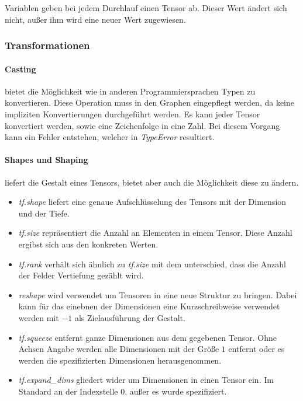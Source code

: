 Variablen geben bei jedem Durchlauf einen Tensor ab.
Dieser Wert ändert sich nicht, außer ihm wird eine neuer Wert zugewiesen. 

\subsubsection{Transformationen}

\paragraph{Casting} bietet die Möglichkeit wie in anderen Programmiersprachen Typen zu konvertieren. 
Diese Operation muss in den Graphen eingepflegt werden, da keine impliziten Konvertierungen durchgeführt werden. 
Es kann jeder Tensor konvertiert werden, sowie eine Zeichenfolge in eine Zahl. 
Bei diesem Vorgang kann ein Fehler entstehen, welcher in \textit{TypeError} resultiert.

\paragraph{Shapes und Shaping} liefert die Gestalt eines Tensors, bietet aber auch die Möglichkeit diese zu ändern. 
\begin{itemize}
	\item \textit{tf.shape} liefert eine genaue Aufschlüsselung des Tensors mit der Dimension und der Tiefe.
	\item \textit{tf.size} repräsentiert die Anzahl an Elementen in einem Tensor. 
	Diese Anzahl ergibst sich aus den konkreten Werten.
	\item \textit{tf.rank} verhält sich ähnlich zu \textit{tf.size} mit dem unterschied, dass die Anzahl der Felder Vertiefung gezählt wird.
	\item \textit{reshape} wird verwendet um Tensoren in eine neue Struktur zu bringen. 
	Dabei kann für das einebnen der Dimensionen eine Kurzschreibweise verwendet werden mit $-1$ als Zielausführung der Gestalt.
	\item \textit{tf.squeeze} entfernt ganze Dimensionen aus dem gegebenen Tensor. 
	Ohne Achsen Angabe werden alle Dimensionen mit der Größe $1$ entfernt oder es werden die spezifizierten Dimensionen herausgenommen.
	\item \textit{tf.expand\_dims} gliedert wider um Dimensionen in einen Tensor ein. 
	Im Standard an der Indexstelle $0$, außer es wurde spezifiziert.
\end{itemize}

